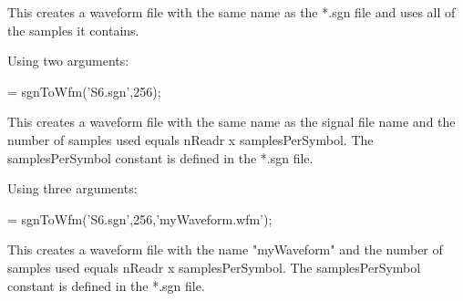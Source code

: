 \noindent
This creates a waveform file with the same name as the *.sgn file and uses all of the samples it contains.
\bigskip

\noindent
Using two arguments:

\bigskip

 = sgnToWfm('S6.sgn',256);
\bigskip

\noindent
This creates a waveform file with the same name as the signal file name and the number of samples used equals nReadr x samplesPerSymbol. The samplesPerSymbol constant is 	defined in the *.sgn file.
\bigskip

\noindent
Using three arguments:

\bigskip

 = sgnToWfm('S6.sgn',256,'myWaveform.wfm');
\bigskip

\noindent
This creates a waveform file with the name "myWaveform" and the number of samples used equals nReadr x samplesPerSymbol. The samplesPerSymbol constant is defined in the *.sgn file.

